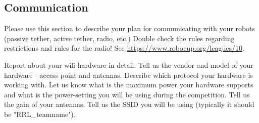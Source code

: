 \subsection{Communication}
Please use this section to describe your plan for communicating with your robots (passive tether, active tether, radio, etc.)  Double check the rules regarding restrictions and rules for the radio! See \url{https://www.robocup.org/leagues/10}.

Report about your wifi hardware in detail. Tell us the vendor and model of your hardware - access point and antennas. Describe which protocol your hardware is working with. Let us know what is the maximum power your hardware supports and what is the power-setting you will be using during the competition.  Tell us the gain of your antennas. Tell us the SSID you will be using (typically it should be "RRL\_teamname"). 